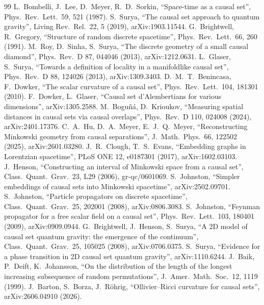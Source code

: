 \documentclass[11pt,a4paper]{article}
\begin{document}
\begin{thebibliography}{99}\small
{} L.~Bombelli, J.~Lee, D.~Meyer, R.~D.~Sorkin, ``Space-time as a causal set'', Phys.\ Rev.\ Lett.\ 59, 521 (1987).
 S.~Surya, ``The causal set approach to quantum gravity'', Living Rev.\ Rel.\ 22, 5 (2019), arXiv:1903.11544.
 G.~Brightwell, R.~Gregory, ``Structure of random discrete spacetime'', Phys.\ Rev.\ Lett.\ 66, 260 (1991).
 M.~Roy, D.~Sinha, S.~Surya, ``The discrete geometry of a small causal diamond'', Phys.\ Rev.\ D 87, 044046 (2013), arXiv:1212.0631.
 L.~Glaser, S.~Surya, ``Towards a definition of locality in a manifoldlike causal set'', Phys.\ Rev.\ D 88, 124026 (2013), arXiv:1309.3403.
 D.~M.~T.~Benincasa, F.~Dowker, ``The scalar curvature of a causal set'', Phys.\ Rev.\ Lett.\ 104, 181301 (2010).
 F.~Dowker, L.~Glaser, ``Causal set d'Alembertians for various dimensions'', arXiv:1305.2588.
 M.~Bogu\~n\'a, D.~Krioukov, ``Measuring spatial distances in causal sets via causal overlaps'', Phys.\ Rev.\ D 110, 024008 (2024), arXiv:2401.17376.
 C.~A.~Hu, D.~A.~Meyer, E.~J.~Q.~Meyer, ``Reconstructing Minkowski geometry from causal separations'', J.\ Math.\ Phys.\ 66, 122502 (2025), arXiv:2601.03280.
 J.~R.~Clough, T.~S.~Evans, ``Embedding graphs in Lorentzian spacetime'', PLoS ONE 12, e0187301 (2017), arXiv:1602.03103.
 J.~Henson, ``Constructing an interval of Minkowski space from a causal set'', Class.\ Quant.\ Grav.\ 23, L29 (2006), gr-qc/0601069.
 S.~Johnston, ``Simpler embeddings of causal sets into Minkowski spacetime'', arXiv:2502.09701.
 S.~Johnston, ``Particle propagators on discrete spacetime'', Class.\ Quant.\ Grav.\ 25, 202001 (2008), arXiv:0806.3083.
 S.~Johnston, ``Feynman propagator for a free scalar field on a causal set'', Phys.\ Rev.\ Lett.\ 103, 180401 (2009), arXiv:0909.0944.
 G.~Brightwell, J.~Henson, S.~Surya, ``A 2D model of causal set quantum gravity: the emergence of the continuum'', Class.\ Quant.\ Grav.\ 25, 105025 (2008), arXiv:0706.0375.
 S.~Surya, ``Evidence for a phase transition in 2D causal set quantum gravity'', arXiv:1110.6244.
 J.~Baik, P.~Deift, K.~Johansson, ``On the distribution of the length of the longest increasing subsequence of random permutations'', J.\ Amer.\ Math.\ Soc.\ 12, 1119 (1999).
 J.~Barton, S.~Borza, J.~R\"ohrig, ``Ollivier--Ricci curvature for causal sets'', arXiv:2606.04910 (2026).

\end{thebibliography}
\end{document}
